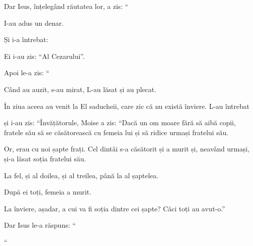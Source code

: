 {\par }{\PP {}Dar Isus, înțelegând răutatea lor, a zis: “{}


\par }{\PP I-au adus un denar.


\par }{\PP {}Și i-a întrebat:
{}


\par }{\PP {}Ei i-au zis: “Al Cezarului”.

\par }{\PP Apoi le-a zis: “{}


\par }{\PP {}Când au auzit, s-au mirat, L-au lăsat și au plecat.


\par }{\PP {}În ziua aceea au venit la El saducheii, care zic că nu există înviere. L-au întrebat

și i-au zis: “Învățătorule, Moise a zis: “Dacă un om moare fără să aibă copii, fratele său să se căsătorească cu femeia lui și să ridice urmași fratelui său.

Or, erau cu noi șapte frați. Cel dintâi s-a căsătorit și a murit și, neavând urmași, și-a lăsat soția fratelui său.

La fel, și al doilea, și al treilea, până la al șaptelea.

După ei toți, femeia a murit.

La înviere, așadar, a cui va fi soția dintre cei șapte? Căci toți au avut-o.”


\par }{\PP {}Dar Isus le-a răspuns: “{}



“{}


}
